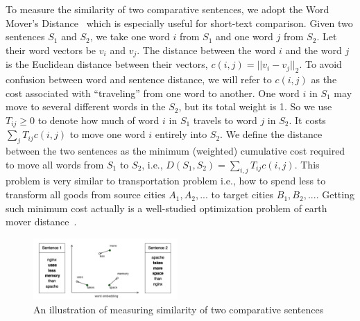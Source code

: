 To measure the similarity of two comparative sentences, we adopt the Word Mover's Distance~\cite{kusner2015word} which is especially useful for short-text comparison.
Given two sentences $S_1$ and $S_2$, we take one word $i$ from $S_1$ and one word $j$ from $S_2$.
Let their word vectors be $v_i$ and $v_j$.
The distance between the word $i$ and the word $j$ is the Euclidean distance between their vectors, $c(i, j) = ||v_i - v_j||_2$.
To avoid confusion between word and sentence distance, we will refer to $c(i, j)$ as the cost associated with ``traveling'' from one word to another.
One word $i$ in $S_1$ may move to several different words in the $S_2$, but its total weight is 1.
So we use $T_{ij} \geq 0$ to denote how much of word $i$ in $S_1$ travels to word $j$ in $S_2$.
It costs $\sum_j T_{ij}c(i,j)$ to move one word $i$ entirely into $S_2$.
We define the distance between the two sentences as the minimum (weighted) cumulative cost required to move all words from $S_1$ to $S_2$, i.e., $D(S_1, S_2) = \sum_{i,j} T_{ij}c(i,j)$.
This problem is very similar to transportation problem i.e., how to spend less to transform all goods from source cities $A_1, A_2, ...$ to target cities $B_1, B_2, ...$.
Getting such minimum cost actually is a well-studied optimization problem of earth mover distance~\cite{ling2007efficient, pele2009fast}.

\begin{figure}
	\centering
	\includegraphics[width=0.49\textwidth]{figures/wmd1.pdf}
	\vspace{-7mm}
	\caption{An illustration of measuring similarity of two comparative sentences }
	\vspace{-3mm}
	\label{fig:wmd}
\end{figure}

